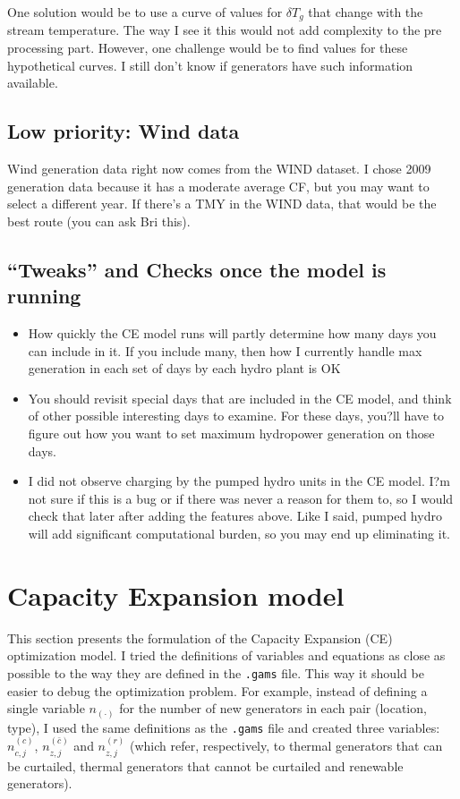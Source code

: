 \documentclass[11pt, oneside]{article}   	%
\newcommand{\bc}{\bar{c}}
\begin{document}
One solution would be to use a curve of values for $\delta T_g$ that change with the stream temperature. The way I see it this would not add complexity to the pre processing part. However, one challenge would be to find values for these hypothetical curves. I still don't know if generators have such information available.

\subsection{Low priority: Wind data}

Wind generation data right now comes from the WIND dataset. I chose 2009 generation data because it has a moderate average CF, but you may want to select a different year. If there's a TMY in the WIND data, that would be the best route (you can ask Bri this). 

\subsection{``Tweaks'' and Checks once the model is running}

\begin{itemize}
\item How quickly the CE model runs will partly determine how many days you can include in it. If you include many, then how I currently handle max generation in each set of days by each hydro plant is OK
\item You should revisit special days that are included in the CE model, and think of other possible interesting days to examine. For these days, you?ll have to figure out how you want to set maximum hydropower generation on those days. 
\item I did not observe charging by the pumped hydro units in the CE model. I?m not sure if this is a bug or if there was never a reason for them to, so I would check that later after adding the features above. Like I said, pumped hydro will add significant computational burden, so you may end up eliminating it.
\end{itemize}


\newpage
\section{Capacity Expansion model}

This section presents the formulation of the Capacity Expansion (CE) optimization model. I tried the definitions of variables and equations as close as possible to the way they are defined in the \texttt{.gams} file. This way it should be easier to debug the optimization problem. For example, instead of defining a single variable $n_{(\cdot)}$ for the number of new generators in each pair (location, type), I used the same definitions as the \texttt{.gams} file and created three variables: $n^{(c)}_{c, j}$, $n^{(\bc)}_{z, j}$ and $n^{(r)}_{z, j}$ (which refer, respectively, to thermal generators that can be curtailed, thermal generators that cannot be curtailed and renewable generators).
\end{document}
